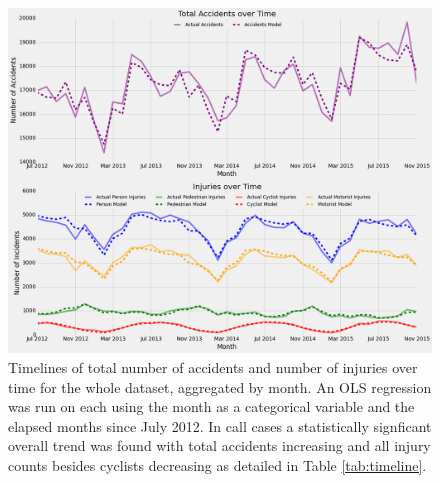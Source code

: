 \documentclass[10pt,journal,compsoc]{IEEEtran}
\begin{document}
\begin{figure}[h]
	\centering
	\includegraphics[width=\textwidth]{fig1.png}
	\caption{Timelines of total number of accidents and number of injuries over time for the whole dataset, aggregated by month.  An OLS regression was run on each using the month as a categorical variable and the elapsed months since July 2012.  In call cases a statistically signficant overall trend was found with total accidents increasing and all injury counts besides cyclists decreasing as detailed in Table \ref{tab:timeline}.}\label{fig:timeline}
\end{figure}
\end{document}
